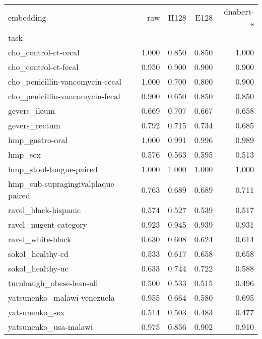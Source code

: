 \begin{tabular}{lrrrr}
\toprule
embedding & raw & H128 & E128 & dnabert-s \\
task &  &  &  &  \\
\midrule
cho_control-ct-cecal & 1.000 & 0.850 & 0.850 & 1.000 \\
cho_control-ct-fecal & 0.950 & 0.900 & 0.900 & 0.900 \\
cho_penicillin-vancomycin-cecal & 1.000 & 0.700 & 0.800 & 0.900 \\
cho_penicillin-vancomycin-fecal & 0.900 & 0.650 & 0.850 & 0.850 \\
gevers_ileum & 0.669 & 0.707 & 0.667 & 0.658 \\
gevers_rectum & 0.792 & 0.715 & 0.734 & 0.685 \\
hmp_gastro-oral & 1.000 & 0.991 & 0.996 & 0.989 \\
hmp_sex & 0.576 & 0.563 & 0.595 & 0.513 \\
hmp_stool-tongue-paired & 1.000 & 1.000 & 1.000 & 1.000 \\
hmp_sub-supragingivalplaque-paired & 0.763 & 0.689 & 0.689 & 0.711 \\
ravel_black-hispanic & 0.574 & 0.527 & 0.539 & 0.517 \\
ravel_nugent-category & 0.923 & 0.945 & 0.939 & 0.931 \\
ravel_white-black & 0.630 & 0.608 & 0.624 & 0.614 \\
sokol_healthy-cd & 0.533 & 0.617 & 0.658 & 0.658 \\
sokol_healthy-uc & 0.633 & 0.744 & 0.722 & 0.588 \\
turnbaugh_obese-lean-all & 0.500 & 0.533 & 0.515 & 0.496 \\
yatsunenko_malawi-venezuela & 0.955 & 0.664 & 0.580 & 0.695 \\
yatsunenko_sex & 0.514 & 0.503 & 0.483 & 0.477 \\
yatsunenko_usa-malawi & 0.975 & 0.856 & 0.902 & 0.910 \\
\bottomrule
\end{tabular}
